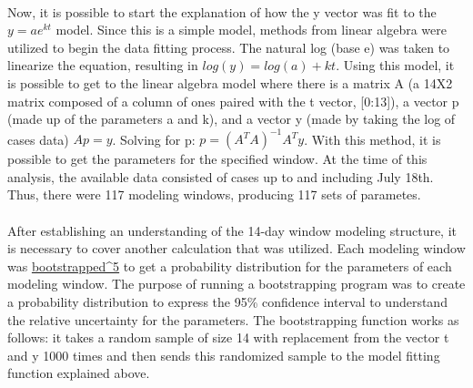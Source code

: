 \documentclass[12pt]{article}
\begin{document}
\paragraph{} Now, it is possible to start the explanation of how the y vector was fit to the $y = ae^{kt}$ model. Since this is a simple model, methods from linear algebra were utilized to begin the data fitting process. The natural log (base e) was taken to linearize the equation, resulting in $log(y) = log(a) + kt$. Using this model, it is possible to get to the linear algebra model where there is a matrix A (a 14X2 matrix composed of a column of ones paired with the t vector, [0:13]), a vector p (made up of the parameters a and k), and a vector y (made by taking the log of cases data) $Ap = y$. Solving for p: $ p = (A^T A)^{-1}  A^T  y$. With this method, it is possible to get the parameters for the specified window. At the time of this analysis, the available data consisted of cases up to and including July 18th. Thus, there were 117 modeling windows, producing 117 sets of parametes.
\paragraph{} After establishing an understanding of the 14-day window modeling structure, it is necessary to cover another calculation that was utilized. Each modeling window was \href{https://www.mathworks.com/help/stats/bootstrp.html}{bootstrapped^5} to get a probability distribution for the parameters of each modeling window. The purpose of running a bootstrapping program was to create a probability distribution to express the 95\% confidence interval to understand the relative uncertainty for the parameters. The bootstrapping function works as follows: it takes a random sample of size 14 with replacement from the vector t and y 1000 times and then sends this randomized sample to the model fitting function explained above.
\end{document}
